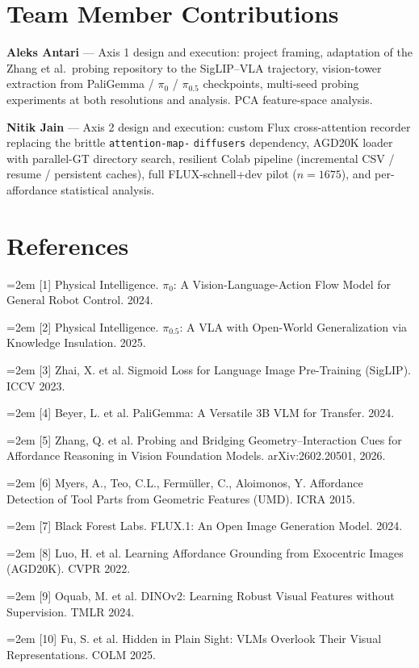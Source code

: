 \documentclass[11pt,letterpaper]{article}
\newcommand{\refitem}[1]{%
  \par\noindent\hangindent=2em\hangafter=1 \small #1\par%
}
\begin{document}
\section*{Team Member Contributions}

\textbf{Aleks Antari} — Axis 1 design and execution: project framing, adaptation of the Zhang et al.\ probing repository to the SigLIP--VLA trajectory, vision-tower extraction from PaliGemma / $\pi_0$ / $\pi_{0.5}$ checkpoints, multi-seed probing experiments at both resolutions and analysis. PCA feature-space analysis.

\textbf{Nitik Jain} — Axis 2 design and execution: custom Flux cross-attention recorder replacing the brittle \mbox{\texttt{attention-map-}} \mbox{\texttt{diffusers}} dependency, AGD20K loader with parallel-GT directory search, resilient Colab pipeline (incremental CSV / resume / persistent caches), full FLUX-schnell+dev pilot ($n{=}1675$), and per-affordance statistical analysis.

\section*{References}
\refitem{[1] Physical Intelligence. $\pi_0$: A Vision-Language-Action Flow Model for General Robot Control. 2024.}
\refitem{[2] Physical Intelligence. $\pi_{0.5}$: A VLA with Open-World Generalization via Knowledge Insulation. 2025.}
\refitem{[3] Zhai, X. et al. Sigmoid Loss for Language Image Pre-Training (SigLIP). ICCV 2023.}
\refitem{[4] Beyer, L. et al. PaliGemma: A Versatile 3B VLM for Transfer. 2024.}
\refitem{[5] Zhang, Q. et al. Probing and Bridging Geometry--Interaction Cues for Affordance Reasoning in Vision Foundation Models. arXiv:2602.20501, 2026.}
\refitem{[6] Myers, A., Teo, C.L., Ferm\"uller, C., Aloimonos, Y. Affordance Detection of Tool Parts from Geometric Features (UMD). ICRA 2015.}
\refitem{[7] Black Forest Labs. FLUX.1: An Open Image Generation Model. 2024.}
\refitem{[8] Luo, H. et al. Learning Affordance Grounding from Exocentric Images (AGD20K). CVPR 2022.}
\refitem{[9] Oquab, M. et al. DINOv2: Learning Robust Visual Features without Supervision. TMLR 2024.}
\refitem{[10] Fu, S. et al. Hidden in Plain Sight: VLMs Overlook Their Visual Representations. COLM 2025.}
\end{document}
